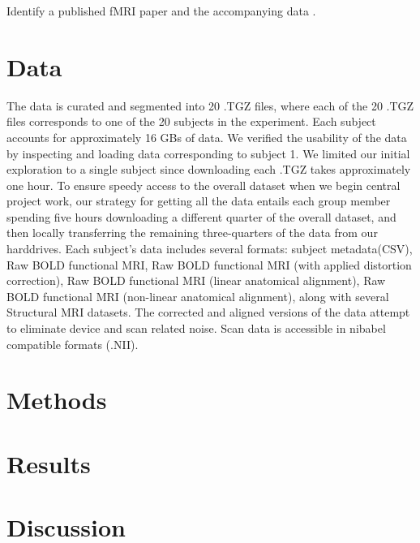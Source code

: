 \documentclass[11pt]{article}
\begin{document}
Identify a published fMRI paper and the accompanying data
\cite{hank2014audiomovie}.

\section{Data}
The data is curated and segmented into 20 .TGZ files, where each of the 20 .TGZ 
files corresponds to one of the 20 subjects in the experiment. Each subject 
accounts for approximately 16 GBs of data. We verified the usability of the data
by inspecting and loading data corresponding to subject 1. We limited our 
initial exploration to a single subject since downloading each .TGZ takes 
approximately one hour. To ensure speedy access to the overall dataset when we 
begin central project work, our strategy for getting all the data entails each 
group member spending five hours downloading a different quarter of the overall
dataset, and then locally transferring the remaining three-quarters of the data
from our harddrives. Each subject's data includes several formats: subject
metadata(CSV), Raw BOLD functional MRI, Raw BOLD functional MRI 
(with applied distortion correction), Raw BOLD functional MRI (linear anatomical
alignment), Raw BOLD functional MRI (non-linear anatomical alignment), along 
with several Structural MRI datasets. The corrected and aligned versions of the
data attempt to eliminate device and scan related noise. Scan data is 
accessible in nibabel compatible formats (.NII).

\section{Methods}
\section{Results}
\section{Discussion}



\end{document}
